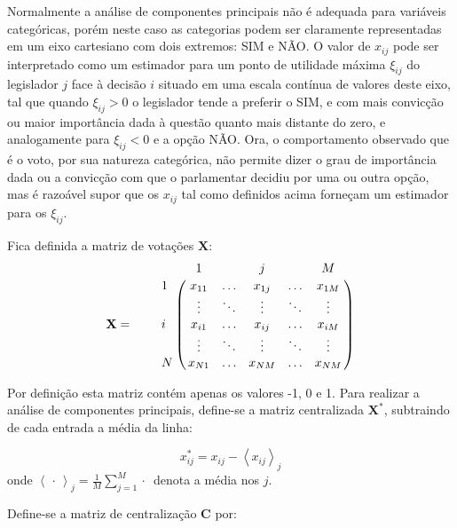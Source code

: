 \documentclass[a4paper, 12pt]{article}
\newcommand{\tikzmark}[1]{\tikz[overlay, remember picture] \coordinate (#1);}
\let\bbordermatrix\bordermatrix
\begin{document}
Normalmente a análise de componentes principais não é adequada para variáveis categóricas, porém neste caso as categorias podem ser claramente representadas em um eixo cartesiano com dois extremos: SIM e NÃO. O valor de $x_{ij}$ pode ser interpretado como um estimador para um ponto de utilidade máxima $\xi_{ij}$ do legislador $j$ face à decisão $i$ situado em uma escala contínua de valores deste eixo, tal que quando $\xi_{ij} > 0$ o legislador tende a preferir o SIM, e com mais convicção ou maior importância dada à questão quanto mais distante do zero, e analogamente para $\xi_{ij} < 0$ e a opção NÃO. Ora, o comportamento observado que é o voto, por sua natureza categórica, não permite dizer o grau de importância dada ou a convicção com que o parlamentar decidiu por uma ou outra opção, mas é razoável supor que os $x_{ij}$ tal como definidos acima forneçam um estimador para os $\xi_{ij}$.

Fica definida a matriz de votações $\mathbf{X}$:
\medskip{}
\[
  \mathbf{X} = \qquad \bbordermatrix{~  & \tikzmark{harrowleft} 1 & ~ & j & ~
                        & M\tikzmark{harrowright}  \cr
                    \tikzmark{varrowtop} 
                    1 & x_{11} & \ldots & x_{1j} & \ldots & x_{1M} \cr
                    ~ & \vdots & \ddots & \vdots & \ddots & \vdots \cr
                    i & x_{i1} & \ldots & x_{ij} & \ldots & x_{iM} \cr
                    ~ & \vdots & \ddots & \vdots & \ddots & \vdots \cr
                    \tikzmark{varrowbottom}
                    N & x_{N1} & \ldots & x_{NM} & \ldots & x_{NM} \cr
                    }
\]

Por definição esta matriz contém apenas os valores -1, 0 e 1. Para realizar a análise de componentes principais, define-se a matriz centralizada $\mathbf{X^{*}}$, subtraindo de cada entrada a média da linha:

\begin{equation}
  x_{ij}^{*} = x_{ij} - \left< x_{ij} \right>_j 
  \label{eq:x-estrela}
\end{equation}
onde $\left< \,\cdot\, \right>_j = \frac{1}{M}\sum_{j=1}^{M} \cdot\,$ denota a média nos $j$.

Define-se a matriz de centralização $\mathbf{C}$ por:
\end{document}

